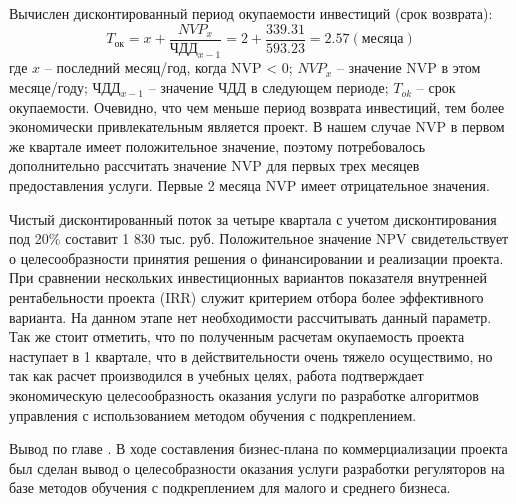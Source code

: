 Вычислен дисконтированный период окупаемости инвестиций (срок возврата):
\begin{equation*}
	T_{\text{ок}} = x + \frac{NVP_x} {\text{ЧДД}_{x-1}} = 2 + \frac{339.31}{593.23} = 2.57 (\text{месяца})
\end{equation*} 
где $x$ -- последний месяц/год, когда NVP < 0; $NVP_x$ -- значение NVP в этом месяце/году;  ЧДД$_{x-1}$ -- значение ЧДД в следующем периоде; $T_{ok}$ -- срок окупаемости. 
Очевидно, что чем меньше период возврата инвестиций, тем более экономически привлекательным является проект. В нашем случае NVP в первом же квартале имеет положительное значение, поэтому потребовалось дополнительно рассчитать значение NVP для первых трех месяцев предоставления услуги. Первые 2 месяца NVP имеет отрицательное значения. 

Чистый дисконтированный поток за четыре квартала с учетом дисконтирования под 20\% составит 1 830 тыс. руб. Положительное значение NPV свидетельствует о целесообразности принятия решения о финансировании и реализации проекта. При сравнении нескольких инвестиционных вариантов показателя внутренней рентабельности проекта (IRR) служит критерием отбора более эффективного варианта. На данном этапе нет необходимости рассчитывать данный параметр. Так же стоит отметить, что по полученным расчетам окупаемость проекта наступает в 1 квартале, что в действительности очень тяжело осуществимо, но так как расчет производился в учебных целях, работа подтверждает экономическую целесообразность оказания услуги по разработке алгоритмов управления с использованием методом обучения с подкреплением. 

\newpage
Вывод по главе \thechapter. В ходе составления бизнес-плана по коммерциализации проекта был сделан вывод о целесобразности оказания услуги разработки регуляторов на базе методов обучения с подкреплением для малого и среднего бизнеса.

\newpage
%
